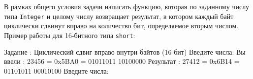 
\begin{zztask}
В рамках общего условия задачи написать функцию, которая по заданному числу
типа \texttt{Integer} и целому числу возвращает результат, в котором каждый байт
циклически сдвинут вправо на количество бит, определяемое вторым числом.
Пример работы для 16-битного типа \texttt{short}:
\begin{zzoutput}
  Задание \thezztask: Циклический сдвиг вправо внутри байтов (16 бит)
  Введите числа: 
  Вы ввели  : 23456 = 0x5BA0 = 01011011 10100000
  Результат : 27412 = 0x6B14 = 01101011 00010100
  Введите числа: \zzuser{ }
\end{zzoutput}
\end{zztask}


